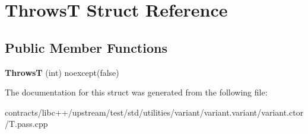 \hypertarget{struct_throws_t}{}\section{ThrowsT Struct Reference}
\label{struct_throws_t}
\subsection*{Public Member Functions}
\begin{DoxyCompactItemize}
\item 
\mbox{\label{struct_throws_t_ad4073869b3467c9a96e10a7354adf97e}} 
{\bfseries ThrowsT} (int) noexcept(false)
\end{DoxyCompactItemize}


The documentation for this struct was generated from the following file\+:\begin{DoxyCompactItemize}
\item 
contracts/libc++/upstream/test/std/utilities/variant/variant.\+variant/variant.\+ctor/T.\+pass.\+cpp\end{DoxyCompactItemize}
